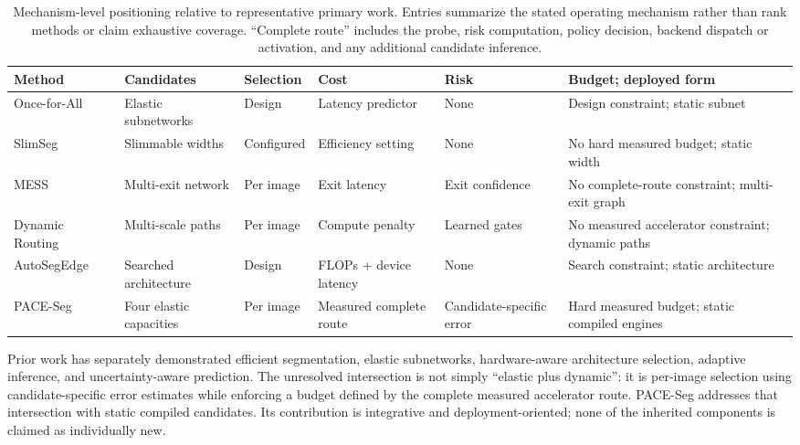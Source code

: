 \documentclass[a4paper,review,12pt]{elsarticle}
\newcommand{\method}{PACE-Seg}
\begin{document}
\begin{table}[H]
\centering
\caption{Mechanism-level positioning relative to representative primary work. Entries summarize the stated operating mechanism rather than rank methods or claim exhaustive coverage. ``Complete route'' includes the probe, risk computation, policy decision, backend dispatch or activation, and any additional candidate inference.}
\label{tab:related-positioning}
\scriptsize
\setlength{\tabcolsep}{2pt}
\renewcommand{\arraystretch}{1.08}
\begin{tabular}{@{}>{\raggedright\arraybackslash}p{2.3cm}>{\raggedright\arraybackslash}p{2.0cm}>{\raggedright\arraybackslash}p{1.45cm}>{\raggedright\arraybackslash}p{2.1cm}>{\raggedright\arraybackslash}p{2.0cm}>{\raggedright\arraybackslash}p{3.35cm}@{}}
\toprule
Method & Candidates & Selection & Cost & Risk & Budget; deployed form \\
\midrule
Once-for-All~\cite{cai2020ofa} & Elastic subnetworks & Design & Latency predictor & None & Design constraint; static subnet \\
SlimSeg~\cite{xue2022slimseg} & Slimmable widths & Configured & Efficiency setting & None & No hard measured budget; static width \\
MESS~\cite{kouris2022mess} & Multi-exit network & Per image & Exit latency & Exit confidence & No complete-route constraint; multi-exit graph \\
Dynamic Routing~\cite{li2020dynamic} & Multi-scale paths & Per image & Compute penalty & Learned gates & No measured accelerator constraint; dynamic paths \\
AutoSegEdge~\cite{dou2023autosegedge} & Searched architecture & Design & FLOPs + device latency & None & Search constraint; static architecture \\
\method{} & Four elastic capacities & Per image & Measured complete route & Candidate-specific error & Hard measured budget; static compiled engines \\
\bottomrule
\end{tabular}
\end{table}

Prior work has separately demonstrated efficient segmentation, elastic subnetworks, hardware-aware architecture selection, adaptive inference, and uncertainty-aware prediction. The unresolved intersection is not simply ``elastic plus dynamic'': it is per-image selection using candidate-specific error estimates while enforcing a budget defined by the complete measured accelerator route. \method{} addresses that intersection with static compiled candidates. Its contribution is integrative and deployment-oriented; none of the inherited components is claimed as individually new.
\end{document}
